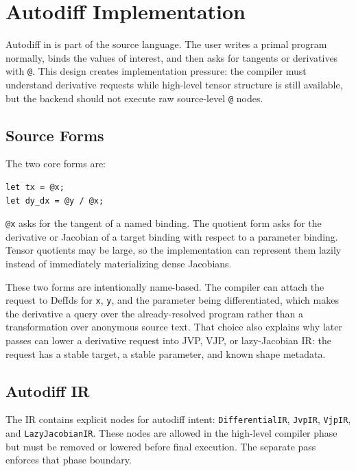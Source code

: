 \chapter{Autodiff Implementation}

Autodiff in \einlang{} is part of the source language. The user writes a primal
program normally, binds the values of interest, and then asks for tangents or
derivatives with \texttt{@}. This design creates implementation pressure: the
compiler must understand derivative requests while high-level tensor structure
is still available, but the backend should not execute raw source-level
\texttt{@} nodes.

\section{Source Forms}

The two core forms are:

\begin{lstlisting}[style=einlang]
let tx = @x;
let dy_dx = @y / @x;
\end{lstlisting}

\texttt{@x} asks for the tangent of a named binding. The quotient form asks for
the derivative or Jacobian of a target binding with respect to a parameter
binding. Tensor quotients may be large, so the implementation can represent
them lazily instead of immediately materializing dense Jacobians.

These two forms are intentionally name-based. The compiler can attach the
request to DefIds for \texttt{x}, \texttt{y}, and the parameter being
differentiated, which makes the derivative a query over the already-resolved
program rather than a transformation over anonymous source text. That choice
also explains why later passes can lower a derivative request into JVP, VJP, or
lazy-Jacobian IR: the request has a stable target, a stable parameter, and
known shape metadata.

\section{Autodiff IR}

The IR contains explicit nodes for autodiff intent:
\texttt{DifferentialIR}, \texttt{JvpIR}, \texttt{VjpIR}, and
\texttt{LazyJacobianIR}. These nodes are allowed in the high-level compiler
phase but must be removed or lowered before final execution. The separate
 pass enforces that phase
boundary.

